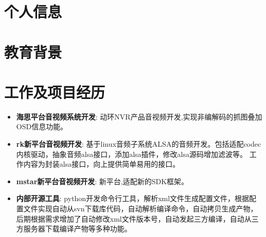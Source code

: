 \documentclass{resume}
\begin{document}


\section{个人信息}
 
\section{教育背景}

\section{工作及项目经历}

\begin{itemize}[parsep=0.2ex]
  \item \textbf{海思平台音视频系统开发}: \newline
    动环NVR产品音视频开发,实现非编解码的抓图叠加OSD信息功能。
  \item \textbf{rk新平台音视频开发}: \newline
    基于linux音频子系统ALSA的音频开发。包括适配codec内核驱动，抽象音频alsa接口，添加alsa插件，修改alsa源码增加滤波等。
    工作内容为封装alsa接口，向上提供简单易用的接口。
  \item \textbf{mstar新平台音视频开发}:\newline
    新平台,适配新的SDK框架。
  \item \textbf{内部开源工具}:\newline
    python开发命令行工具，解析xml文件生成配置文件，根据配置文件实现自动从svn下载库代码，自动解析编译命令，自动拷贝生成产物，
    后期根据需求增加了自动修改xml文件版本号，自动发起三方编译，自动从三方服务器下载编译产物等多种功能。
\end{itemize}
\end{document}
